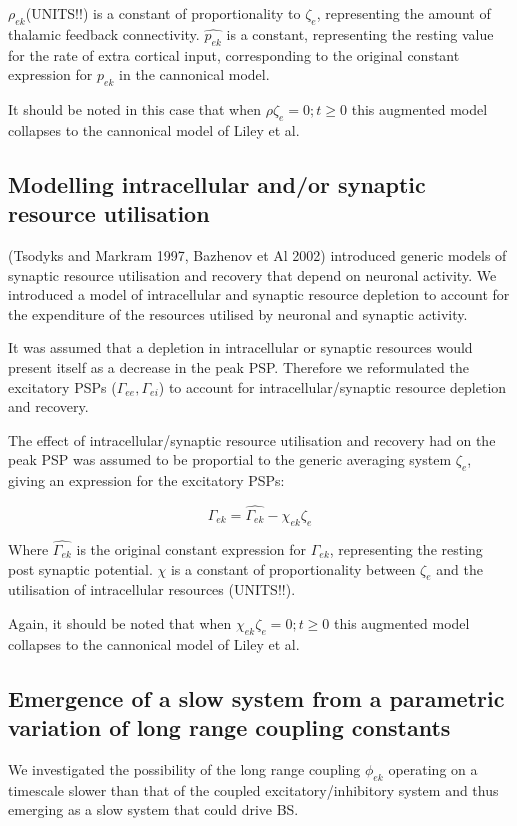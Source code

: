 \documentclass[a4paper,12pt]{article}
\begin{document}
$\rho_{ek}$(UNITS!!) is a constant of proportionality to $\zeta_e$, representing the amount of thalamic feedback connectivity. $\hat{p_{ek}}$ is a constant, representing
the resting value for the rate of extra cortical input, corresponding to the original constant expression for $p_{ek}$ in the cannonical model. 

It should be noted in this case that when $\rho\zeta_e=0; t \geq 0$ this augmented model collapses to the cannonical model of Liley et al.

\subsection{Modelling intracellular and/or synaptic resource utilisation}
(Tsodyks and Markram 1997, Bazhenov et Al 2002) introduced generic models of synaptic resource utilisation and recovery that depend
on neuronal activity. We introduced a model of intracellular and synaptic resource depletion to account for the expenditure of the resources utilised by neuronal and synaptic activity. 

It was assumed that a depletion in intracellular or synaptic resources would present itself as a decrease in the peak PSP. Therefore we reformulated the excitatory PSPs ($\Gamma_{ee}, \Gamma_{ei}$) to
account for intracellular/synaptic resource depletion and recovery.

The effect of intracellular/synaptic resource utilisation and recovery had on the peak PSP was assumed to be proportial to the generic averaging system $\zeta_{e}$, giving an expression for
the excitatory PSPs:

\begin{equation} \label{eq:Gamma_ek}
\Gamma_{ek} = \hat{\Gamma_{ek}} - \chi_{ek} \zeta_e
\end{equation}

Where $\hat{\Gamma_{ek}}$ is the original constant expression for $\Gamma_{ek}$, representing the resting post synaptic potential. $\chi$ is a constant of proportionality between $\zeta_e$ and the utilisation of intracellular resources (UNITS!!).

Again, it should be noted that when $\chi_{ek} \zeta_e=0; t \geq 0$ this augmented model collapses to the cannonical model of Liley et al.

\subsection{Emergence of a slow system from a parametric variation of long range coupling constants}
We investigated the possibility of the long range coupling $\phi_{ek}$ operating on a timescale slower than that of the coupled excitatory/inhibitory system and thus emerging as a slow system that could drive BS. 
\end{document}

